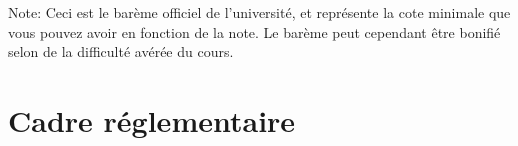 \documentclass[12pt,undergraduate]{uqtrplandecours}
\begin{document}
\printgrades

Note: Ceci est le barème officiel de l'université,
  et représente la cote minimale que vous pouvez avoir en fonction de la note.
Le barème peut cependant être bonifié selon de la difficulté avérée du cours.


\section{Cadre réglementaire}
\cadrereglementaire


\clearpage
\signatures


%
\end{document}
